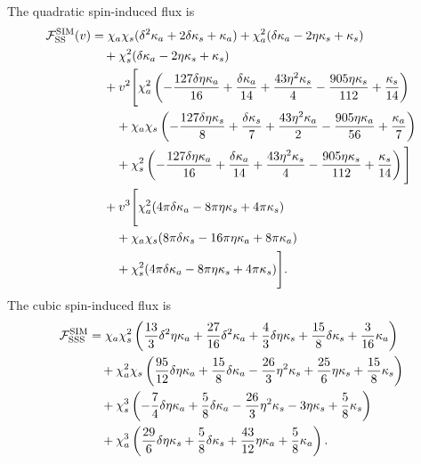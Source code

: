 \documentclass[11pt]{article}
\begin{document}
The quadratic spin-induced flux is
\begin{align}
{\cal F}_{\rm SS}^{\rm SIM}(v)
&=
\chi_a\chi_s(\delta^2\kappa_a+2\delta\kappa_s+\kappa_a)
+\chi_a^2(\delta\kappa_a-2\eta\kappa_s+\kappa_s)
\nonumber\\
&\quad
+\chi_s^2(\delta\kappa_a-2\eta\kappa_s+\kappa_s)
\nonumber\\
&\quad
+v^2\Bigg[
\chi_a^2
\left(
-\frac{127\delta\eta\kappa_a}{16}
+\frac{\delta\kappa_a}{14}
+\frac{43\eta^2\kappa_s}{4}
-\frac{905\eta\kappa_s}{112}
+\frac{\kappa_s}{14}
\right)
\nonumber\\
&\qquad
+\chi_a\chi_s
\left(
-\frac{127\delta\eta\kappa_s}{8}
+\frac{\delta\kappa_s}{7}
+\frac{43\eta^2\kappa_a}{2}
-\frac{905\eta\kappa_a}{56}
+\frac{\kappa_a}{7}
\right)
\nonumber\\
&\qquad
+\chi_s^2
\left(
-\frac{127\delta\eta\kappa_a}{16}
+\frac{\delta\kappa_a}{14}
+\frac{43\eta^2\kappa_s}{4}
-\frac{905\eta\kappa_s}{112}
+\frac{\kappa_s}{14}
\right)
\Bigg]
\nonumber\\
&\quad
+v^3\Bigg[
\chi_a^2(4\pi\delta\kappa_a-8\pi\eta\kappa_s+4\pi\kappa_s)
\nonumber\\
&\qquad
+\chi_a\chi_s(8\pi\delta\kappa_s-16\pi\eta\kappa_a+8\pi\kappa_a)
\nonumber\\
&\qquad
+\chi_s^2(4\pi\delta\kappa_a-8\pi\eta\kappa_s+4\pi\kappa_s)
\Bigg].
\end{align}
The cubic spin-induced flux is
\begin{align}
{\cal F}_{\rm SSS}^{\rm SIM}
&=
\chi_a\chi_s^2
\left(
\frac{13}{3}\delta^2\eta\kappa_a
+\frac{27}{16}\delta^2\kappa_a
+\frac{4}{3}\delta\eta\kappa_s
+\frac{15}{8}\delta\kappa_s
+\frac{3}{16}\kappa_a
\right)
\nonumber\\
&\quad
+\chi_a^2\chi_s
\left(
\frac{95}{12}\delta\eta\kappa_a
+\frac{15}{8}\delta\kappa_a
-\frac{26}{3}\eta^2\kappa_s
+\frac{25}{6}\eta\kappa_s
+\frac{15}{8}\kappa_s
\right)
\nonumber\\
&\quad
+\chi_s^3
\left(
-\frac{7}{4}\delta\eta\kappa_a
+\frac{5}{8}\delta\kappa_a
-\frac{26}{3}\eta^2\kappa_s
-3\eta\kappa_s
+\frac{5}{8}\kappa_s
\right)
\nonumber\\
&\quad
+\chi_a^3
\left(
\frac{29}{6}\delta\eta\kappa_s
+\frac{5}{8}\delta\kappa_s
+\frac{43}{12}\eta\kappa_a
+\frac{5}{8}\kappa_a
\right).
\end{align}
\end{document}
